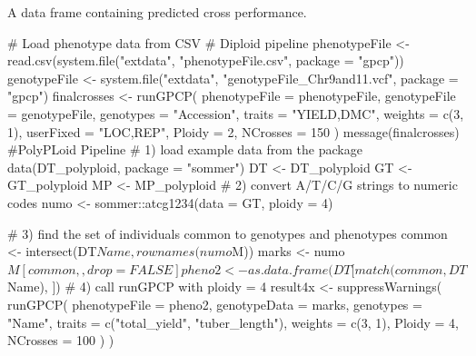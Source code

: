 \documentclass[letterpaper]{book}
\begin{document}
%
\begin{Value}
A data frame containing predicted cross performance.
\end{Value}
%
\begin{Examples}
\begin{ExampleCode}
# Load phenotype data from CSV
# Diploid pipeline
phenotypeFile <- read.csv(system.file("extdata", "phenotypeFile.csv", package = "gpcp"))
genotypeFile <- system.file("extdata", "genotypeFile_Chr9and11.vcf", package = "gpcp")
finalcrosses <- runGPCP(
    phenotypeFile = phenotypeFile,
    genotypeFile = genotypeFile,
    genotypes = "Accession",
    traits = "YIELD,DMC",
    weights = c(3, 1),
    userFixed = "LOC,REP",
    Ploidy = 2,
    NCrosses = 150
)
message(finalcrosses)
 #PolyPLoid Pipeline
 # 1) load example data from the package
data(DT_polyploid, package = "sommer")
DT <- DT_polyploid
GT <- GT_polyploid
MP <- MP_polyploid
# 2) convert A/T/C/G strings to numeric codes
numo <- sommer::atcg1234(data = GT, ploidy = 4)

# 3) find the set of individuals common to genotypes and phenotypes
common <- intersect(DT$Name, rownames(numo$M))
marks  <- numo$M[common, , drop = FALSE]
pheno2 <- as.data.frame(DT[match(common, DT$Name), ])
# 4) call runGPCP with ploidy = 4
result4x <- suppressWarnings(
  runGPCP(
    phenotypeFile = pheno2,
    genotypeData   = marks,
    genotypes      = "Name",
    traits         = c("total_yield", "tuber_length"),
    weights        = c(3, 1),
    Ploidy         = 4,
    NCrosses       = 100
  )
)
\end{ExampleCode}
\end{Examples}
\printindex{}
\end{document}
